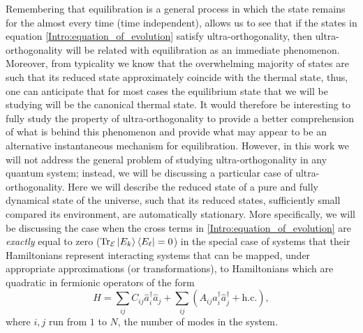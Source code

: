 \indent Remembering that equilibration is a general process in which the state remains for the almost every time (time independent), allows us to see that if the states in equation \eqref{Intro:equation_of_evolution} satisfy ultra-orthogonality, then ultra-orthogonality will be related with equilibration as an immediate phenomenon. Moreover, from typicality we know that the overwhelming majority of states are such that its reduced state approximately coincide with the thermal state, thus, one can anticipate that for most cases the equilibrium state that we will be studying will be the canonical thermal state.
It would therefore be interesting to fully study the property of ultra-orthogonality to provide a better comprehension of what is behind this phenomenon and provide what may appear to be an alternative instantaneous mechanism for equilibration. However, in this work we will not address the general problem of studying ultra-orthogonality in any quantum system; instead, we will be discussing a particular case of ultra-orthogonality. Here we will describe the reduced state of a pure and fully dynamical state of the universe, such that its reduced states, sufficiently small compared its environment, are automatically stationary. More specifically, we will be discussing the case when the cross terms in \eqref{Intro:equation_of_evolution} are \textit{exactly} equal to zero ($\operatorname{Tr}_{\mathcal{E}}\mathinner{|{E_k}\rangle}\mathinner{\langle{E_\ell}|} = 0$) in the special case of systems that their Hamiltonians represent interacting systems that can be mapped, under appropriate approximations (or transformations), to Hamiltonians which are quadratic in fermionic operators of the form
\begin{equation}
\hat{H}=\sum_{i j} C_{i j} \hat{a}_{i}^{\dagger} \hat{a}_{j}+\sum_{i j}\left(A_{i j} \hat{a}_{i}^{\dagger}\hat{a}_{j}^{\dagger}+\mathrm{h.c.}\right),
\label{Intro:QuadraticHamiltonian}
\end{equation}
where $i,j$ run from $1$ to $N$, the number of modes in the system.\\

